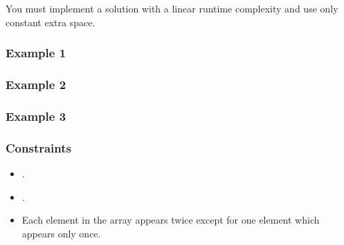 \documentclass[letterpaper,12pt,english]{book}
\begin{document}
\sphinxAtStartPar
You must implement a solution with a linear runtime complexity and use only constant extra space.


\subsubsection{Example 1}
\label{\detokenize{Counting/136_Single_Number:example-1}}
\begin{sphinxVerbatim}[commandchars=\\\{\}]
   \PYG{p}{[}\PYG{p}{]}
 
\end{sphinxVerbatim}


\subsubsection{Example 2}
\label{\detokenize{Counting/136_Single_Number:example-2}}
\begin{sphinxVerbatim}[commandchars=\\\{\}]
   \PYG{p}{[}\PYG{p}{]}
 
\end{sphinxVerbatim}


\subsubsection{Example 3}
\label{\detokenize{Counting/136_Single_Number:example-3}}
\begin{sphinxVerbatim}[commandchars=\\\{\}]
   \PYG{p}{[}\PYG{p}{]}
 
\end{sphinxVerbatim}


\subsubsection{Constraints}
\label{\detokenize{Counting/136_Single_Number:constraints}}\begin{itemize}
\item {} 
\sphinxAtStartPar
{}.

\item {} 
\sphinxAtStartPar
{}.

\item {} 
\sphinxAtStartPar
Each element in the array appears twice except for one element which appears only once.

\end{itemize}
\end{document}
